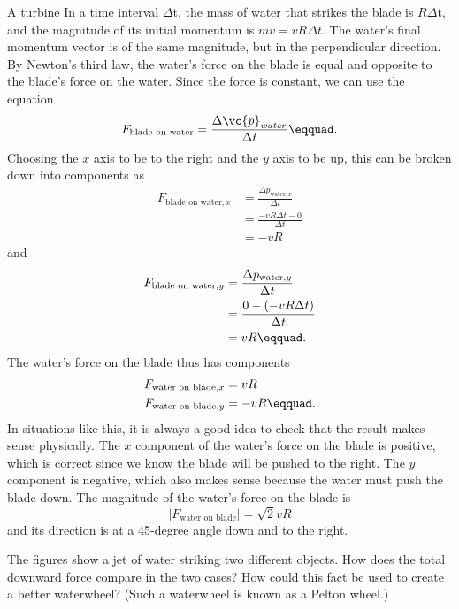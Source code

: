 \begin{eg}{A turbine}
\eganswer In a time interval $\Delta $t, the mass of water
that strikes the blade is $R\Delta $t, and the magnitude of
its initial momentum is $mv=vR\Delta t$. The
water's final momentum vector is of the same magnitude, but
in the perpendicular direction. By Newton's third law, the
water's force on the blade is equal and opposite to the
blade's force on the water. Since the force is constant, we
can use the equation
\begin{equation*}
                F_{\text{blade on water}}         =    \frac{\Delta \vc{p}_{water}}{\Delta t}\eqquad.
\end{equation*}
Choosing the $x$ axis to be to the right and the $y$ axis to
be up, this can be broken down into components as
\begin{align*}
 F_{\text{blade on water},x} &= \frac{\Delta p_{\text{water},x}}{\Delta t} \\
 &= \frac{-vR\Delta t-0}{\Delta t} \\
 &= -vR
\end{align*}
and
\begin{align*}
 F_{\text{blade on water},y} &= \frac{\Delta p_{\text{water},y}}{\Delta t} \\
 &= \frac{0-(-vR\Delta t)}{\Delta t} \\
 &= vR\eqquad.
\end{align*}
The water's force on the blade thus has components
\begin{align*}
 F_{\text{water on blade},x} &= vR \\
 F_{\text{water on blade},y} &= -vR\eqquad.
\end{align*}
In situations like this, it is always a good idea to check
that the result makes sense physically. The $x$ component of
the water's force on the blade is positive, which is correct
since we know the blade will be pushed to the right. The $y$
component is negative, which also makes sense because the
water must push the blade down. The magnitude of the water's
force on the blade is
\begin{equation*}
                |F_{\text{water on blade}}|    =    \sqrt{2}vR
\end{equation*}
and its direction is at a 45-degree angle down and to the right.
\end{eg}

\startdqs
\begin{dq}
The figures show a jet of water striking two different
objects. How does the total downward force compare in the
two cases? How could this fact be used to create a better
waterwheel? (Such a waterwheel is known as a Pelton wheel.)\label{dq:pelton}
\end{dq}

